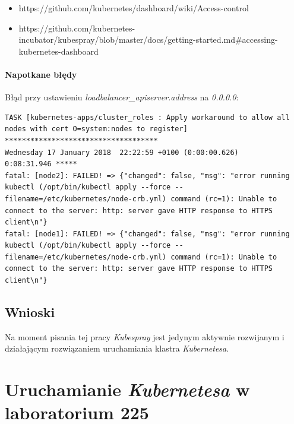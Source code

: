 \documentclass[a4paper,12pt,twoside,openany]{report}
\providecommand{\tightlist}{%
  \setlength{\itemsep}{0pt}\setlength{\parskip}{0pt}}
\begin{document}
\begin{itemize}
\tightlist
\item
  https://github.com/kubernetes/dashboard/wiki/Access-control
\item
  https://github.com/kubernetes-incubator/kubespray/blob/master/docs/getting-started.md\#accessing-kubernetes-dashboard
\end{itemize}

\hypertarget{napotkane-bux142ux119dy-1}{%
\subsubsection{Napotkane błędy}\label{napotkane-bux142ux119dy-1}}

Błąd przy ustawieniu \emph{loadbalancer\_apiserver.address} na
\emph{0.0.0.0}:

\begin{lstlisting}
TASK [kubernetes-apps/cluster_roles : Apply workaround to allow all nodes with cert O=system:nodes to register] ************************************
Wednesday 17 January 2018  22:22:59 +0100 (0:00:00.626)       0:08:31.946 *****
fatal: [node2]: FAILED! => {"changed": false, "msg": "error running kubectl (/opt/bin/kubectl apply --force --filename=/etc/kubernetes/node-crb.yml) command (rc=1): Unable to connect to the server: http: server gave HTTP response to HTTPS client\n"}
fatal: [node1]: FAILED! => {"changed": false, "msg": "error running kubectl (/opt/bin/kubectl apply --force --filename=/etc/kubernetes/node-crb.yml) command (rc=1): Unable to connect to the server: http: server gave HTTP response to HTTPS client\n"}
\end{lstlisting}

\hypertarget{wnioski-4}{%
\section{Wnioski}\label{wnioski-4}}

Na moment pisania tej pracy \emph{Kubespray} jest jedynym aktywnie
rozwijanym i działającym rozwiązaniem uruchamiania klastra
\emph{Kubernetesa}.

\hypertarget{uruchamianie-kubernetesa-w-laboratorium-225}{%
\chapter{\texorpdfstring{Uruchamianie \emph{Kubernetesa} w laboratorium
225}{Uruchamianie Kubernetesa w laboratorium 225}}\label{uruchamianie-kubernetesa-w-laboratorium-225}}
\end{document}
